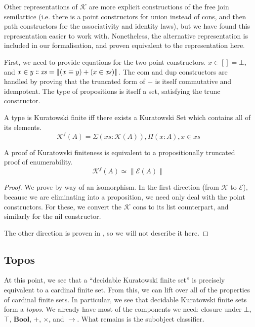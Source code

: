 Other representations of \(\mathcal{K}\) \cite{fruminFiniteSetsHomotopy2018}
are more explicit constructions of the free join semilattice (i.e. there is a
point constructors for union instead of cons, and then path constructors for
the associativity and identity laws), but we have found this representation
easier to work with.
Nonetheless, the alternative representation is included in our formalisation,
and proven equivalent to the representation here.
\begin{rm-definition}
  First, we need to provide equations for the two point constructors.
  \(x \in [] = \bot\), and \(x \in y \dblcolon \mathit{xs} = \lVert (x \equiv y)
  + (x \in \mathit{xs}) \rVert \).
  The \(\text{com}\) and \(\text{dup}\) constructors are handled by proving that
  the truncated form of \(+\) is itself commutative and idempotent.
  The type of propositions is itself a set, satisfying the \(\text{trunc}\)
  constructor.
\end{rm-definition}
\begin{rm-definition}
  A type is Kuratowski finite iff there exists a Kuratowski Set which contains
  all of its elements.
  \begin{equation}
    \mathcal{K}^{f}(A) = \Sigma {(\mathit{xs} : \mathcal{K}(A))} , \Pi (x : A) , x \in \mathit{xs}
  \end{equation}
\end{rm-definition}

\begin{rm-theorem}
  A proof of Kuratowski finiteness is equivalent to a propositionally truncated
  proof of enumerability.
  \begin{equation}
    \mathcal{K}^f(A) \simeq \lVert \mathcal{E}(A) \rVert
  \end{equation}
\end{rm-theorem}
\begin{proof}
  We prove by way of an isomorphism.
  In the first direction (from \(\mathcal{K}\) to \(\mathcal{E}\)), because we
  are eliminating into a proposition, we need only deal with the point
  constructors.
  For these, we convert the \(\mathcal{K}\) cons to its list counterpart, and
  similarly for the nil constructor.

  The other direction is proven in \cite{fruminFiniteSetsHomotopy2018}, so we
  will not describe it here.
\end{proof}
\subsection{Topos}
At this point, we see that a ``decidable Kuratowski finite set'' is precisely
equivalent to a cardinal finite set.
From this, we can lift over all of the properties of cardinal finite sets.
In particular, we see that decidable Kuratowski finite sets form a \emph{topos}.
We already have most of the components we need: closure under \(\bot\),
\(\top\), \(\mathbf{Bool}\), \(+\), \(\times\), and \(\rightarrow\).
What remains is the subobject classifier.
\begin{definition}
\end{definition}
